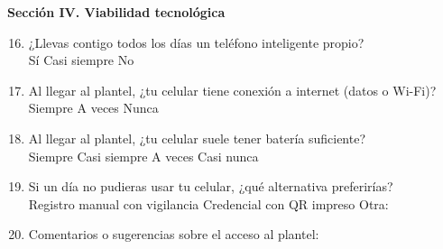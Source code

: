 \medskip
\noindent\textbf{Sección IV. Viabilidad tecnológica}
\begin{enumerate}\setcounter{enumi}{15}
	\item ¿Llevas contigo todos los días un teléfono inteligente propio?\\
	      \op Sí \quad \op Casi siempre \quad \op No
	\item Al llegar al plantel, ¿tu celular tiene conexión a internet (datos o
	      Wi-Fi)?\\
	      \op Siempre \quad \op A veces \quad \op Nunca
	\item Al llegar al plantel, ¿tu celular suele tener batería suficiente?\\
	      \op Siempre \quad \op Casi siempre \quad \op A veces \quad \op Casi nunca
	\item Si un día no pudieras usar tu celular, ¿qué alternativa preferirías?\\
	      \op Registro manual con vigilancia \quad \op Credencial con QR impreso
	      \quad \op Otra: \linea[3cm]
	\item Comentarios o sugerencias sobre el acceso al plantel:\\[0.4em]
	      \linea[\linewidth]\\[0.8em]\linea[\linewidth]
\end{enumerate}
